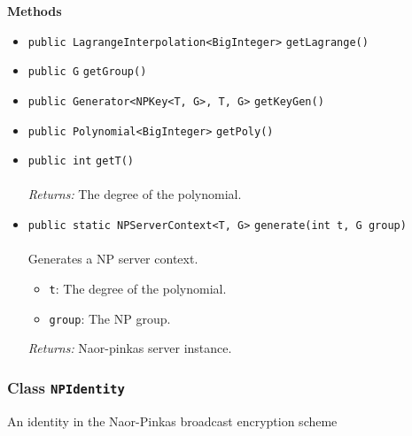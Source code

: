 \textbf{\sffamily Methods}
\begin{itemize}
\item \lstinline|public LagrangeInterpolation<BigInteger>| \lstinline|getLagrange|\lstinline|()| \\[-0.6em]




\item \lstinline|public G| \lstinline|getGroup|\lstinline|()| \\[-0.6em]




\item \lstinline|public Generator<NPKey<T, G>, T, G>| \lstinline|getKeyGen|\lstinline|()| \\[-0.6em]




\item \lstinline|public Polynomial<BigInteger>| \lstinline|getPoly|\lstinline|()| \\[-0.6em]




\item \lstinline|public int| \lstinline|getT|\lstinline|()|\\ \\[-0.6em]
\emph{Returns:} The degree of the polynomial.



\item \lstinline|public static NPServerContext<T, G>| \lstinline|generate|\lstinline|(int t, G group)|\\ \\[-0.6em]
Generates a NP server context.
\begin{itemize}
\item \lstinline|t|: The degree of the polynomial.
\item \lstinline|group|: The NP group.
\end{itemize}

\emph{Returns:} Naor-pinkas server instance.

\end{itemize}

\subsubsection{Class \lstinline|NPIdentity|}
An identity in the Naor-Pinkas broadcast encryption scheme \\
\noindent\begin{minipage}[t]{5cm}
\vspace{0.3em}
\hspace*{2em}
\vspace{0.3em}
\end{minipage}



